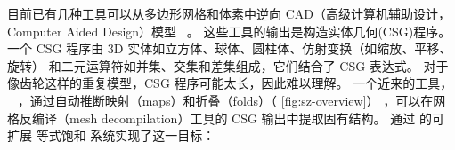 目前已有几种工具可以从多边形网格和体素中逆向 CAD（高级计算机辅助设计，Computer Aided Design）模型
  ~\cite{reincarnate, inverse, shape, csgnet, latex}。
这些工具的输出是构造实体几何(CSG)程序。
一个 CSG 程序由 3D 实体如立方体、球体、圆柱体、仿射变换（如缩放、平移、旋转）
  和二元运算符如并集、交集和差集组成，它们结合了 CSG 表达式。
对于像齿轮这样的重复模型，CSG 程序可能太长，因此难以理解。
一个近来的工具， \sz~\cite{szalinski} ，通过自动推断映射（maps）和折叠（folds）（ \autoref{fig:sz-overview}）
  ，可以在网格反编译（mesh decompilation）工具的 CSG 输出中提取固有结构。
\sz 通过 \egg 的可扩展 等式饱和 系统实现了这一目标：


